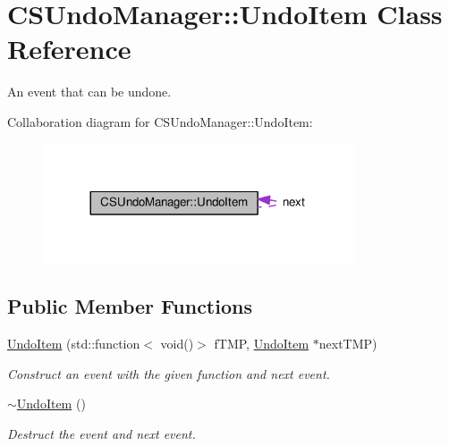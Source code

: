 \hypertarget{classCSUndoManager_1_1UndoItem}{}\section{C\+S\+Undo\+Manager\+:\+:Undo\+Item Class Reference}
\label{classCSUndoManager_1_1UndoItem}


An event that can be undone.  




Collaboration diagram for C\+S\+Undo\+Manager\+:\+:Undo\+Item\+:
\nopagebreak
\begin{figure}[H]
\begin{center}
\leavevmode
\includegraphics[width=260pt]{classCSUndoManager_1_1UndoItem__coll__graph}
\end{center}
\end{figure}
\subsection*{Public Member Functions}
\begin{DoxyCompactItemize}
\item 
\mbox{\label{classCSUndoManager_1_1UndoItem_adddbd4a53854d99d1ad590520d14ba8e}} 
\hyperlink{classCSUndoManager_1_1UndoItem_adddbd4a53854d99d1ad590520d14ba8e}{Undo\+Item} (std\+::function$<$ void()$>$ f\+T\+MP, \hyperlink{classCSUndoManager_1_1UndoItem}{Undo\+Item} $\ast$next\+T\+MP)
\begin{DoxyCompactList}\small\item\em Construct an event with the given function and next event. \end{DoxyCompactList}\item 
\mbox{\label{classCSUndoManager_1_1UndoItem_a4f1e95e08e088f6890099110474062e3}} 
\hyperlink{classCSUndoManager_1_1UndoItem_a4f1e95e08e088f6890099110474062e3}{$\sim$\+Undo\+Item} ()
\begin{DoxyCompactList}\small\item\em Destruct the event and next event. \end{DoxyCompactList}\end{DoxyCompactItemize}
